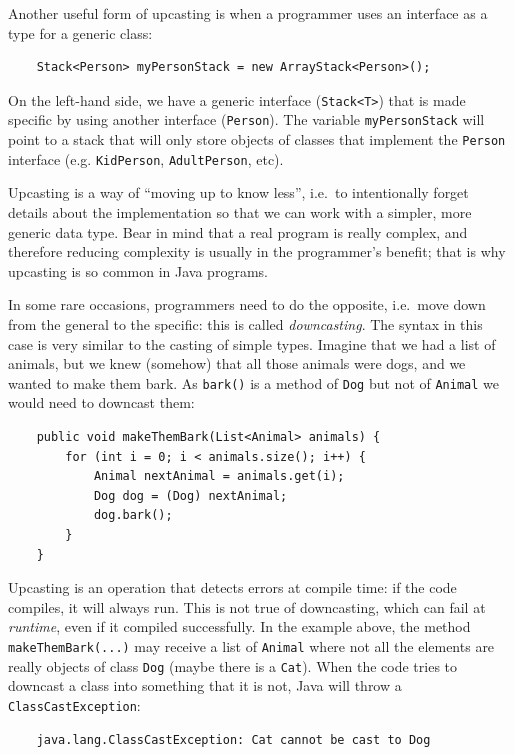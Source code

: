 Another useful form of upcasting is when a programmer uses an
interface as a type for a generic class: 

\begin{verbatim}
    Stack<Person> myPersonStack = new ArrayStack<Person>();
\end{verbatim}

On the left-hand side, we have a generic interface (\verb+Stack<T>+) that is made
specific by using another interface (\verb+Person+). The variable
\verb+myPersonStack+ will point to a stack that will only store
objects of classes that implement the \verb+Person+ interface
(e.g. \verb+KidPerson+, \verb+AdultPerson+, etc). 

Upcasting is a way of ``moving up to know less'', i.e.~to
intentionally forget details about the implementation so that we can
work with a simpler, more generic data type. 
Bear in mind that a real program is really complex, and therefore
reducing complexity is usually in the programmer's benefit; that
is why upcasting is so common in Java programs. 

In some rare occasions,
programmers need to do the opposite, i.e.~move down from the general
to the specific: this is called \emph{downcasting}. The syntax in this
case is very similar to the casting of simple types. Imagine that we
had a list of animals, but we knew (somehow) that all those animals
were dogs, and we wanted to make them bark. As \verb+bark()+ is a
method of \verb+Dog+ but not of \verb+Animal+ we would need to
downcast them: 

\begin{verbatim}
    public void makeThemBark(List<Animal> animals) {
        for (int i = 0; i < animals.size(); i++) {
            Animal nextAnimal = animals.get(i);
            Dog dog = (Dog) nextAnimal;
            dog.bark();
        }
    }
\end{verbatim}

Upcasting is an operation that detects errors at compile time: if the
code compiles, it will always run. This is not true of downcasting, which can
fail at \emph{runtime}, even if it compiled successfully. In the
example above, the method \verb+makeThemBark(...)+ may receive a list
of \verb+Animal+ where not all the elements are really objects of
class \verb+Dog+ (maybe there is a \verb+Cat+). When the code tries to
downcast a class into something that it is not, Java will throw a
\verb+ClassCastException+: 

\begin{verbatim}
    java.lang.ClassCastException: Cat cannot be cast to Dog
\end{verbatim}



